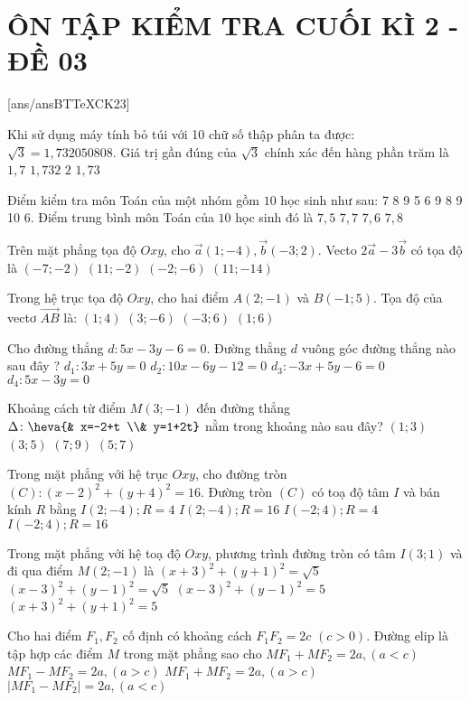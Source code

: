 \section*{ÔN TẬP KIỂM TRA CUỐI KÌ 2 - ĐỀ 03}
\setcounter{ex}{0}\setcounter{bt}{0}
[ans/ansBTTeXCK23]
\begin{ex}
	Khi sử dụng máy tính bỏ túi với 10 chữ số thập phân ta được: $\sqrt{3}=1{,}732050808$. Giá trị gần đúng của $\sqrt{3}$ chính xác đến hàng phần trăm là
	\choice
	{$1{,}7$}
	{$1{,}732$}
	{$2$}
	{$1{,}73$}
\end{ex}
\begin{ex} 
	Điểm kiểm tra môn Toán của một nhóm gồm $10$ học sinh như sau: 7 8 9 5 6 9 8 9 10 6.
	Điểm trung bình môn Toán của $10$ học sinh đó là
	\choice
	{$7{,}5$}
	{$7{,}7$}
	{$7{,}6$}
	{$7{,}8$}
\end{ex}
\begin{ex}
	Trên mặt phẳng tọa độ $Oxy$, cho $\vec{a}(1;-4),\vec{b}(-3;2)$. Vecto $2\vec{a}-3\vec{b}$ có tọa độ là
	\choice
	{$(-7;-2)$}
	{$(11;-2)$}
	{$(-2;-6)$}
	{$(11;-14)$}
\end{ex}
\begin{ex}
	Trong hệ trục tọa độ $Oxy$, cho hai điểm $A(2;-1)$ và $B(-1;5)$. Tọa độ của vectơ $\vec{AB}$ là:
	\choice
	{$(1;4)$}
	{$(3;-6)$}
	{$(-3;6)$}
	{$(1;6)$}
\end{ex}
\begin{ex}
	Cho đường thẳng $d\colon 5x-3y-6=0$. Đường thẳng $d$ vuông góc đường thẳng nào sau đây ?
	\choice
	{$d_1\colon 3x+5y=0$}
	{$d_2\colon 10x-6y-12=0$}
	{$d_3\colon -3x+5y-6=0$}
	{$d_4\colon 5x-3y=0$}
\end{ex}
\begin{ex}
	Khoảng cách từ điểm $M(3;-1)$ đến đường thẳng $\Delta \colon \heva{& x=-2+t \\& y=1+2t}$ nằm trong khoảng nào sau đây?
	\choice
	{$(1;3)$}
	{$(3;5)$}
	{$(7;9)$}
	{$(5;7)$}
\end{ex}
\begin{ex}
	Trong mặt phẳng với hệ trục $Oxy$, cho đường tròn $(C)\colon (x-2)^2+(y+4)^2=16$. Đường tròn $(C)$ có toạ độ tâm $I$ và bán kính $R$ bằng
	\choice
	{$I(2;-4);R=4$}
	{$I(2;-4);R=16$}
	{$I(-2;4);R=4$}
	{$I(-2;4);R=16$}
\end{ex}
\begin{ex}
Trong mặt phẳng với hệ toạ độ $Oxy$, phương trình đường tròn có tâm $I(3;1)$ và đi qua điểm $M(2;-1)$ là
\choice
{${{(x+3)}^2}+{{(y+1)}^2}=\sqrt{5}$}
{${{(x-3)}^2}+{{(y-1)}^2}=\sqrt{5}$}
{${{(x-3)}^2}+{{(y-1)}^2}=5$}
{${{(x+3)}^2}+{{(y+1)}^2}=5$}
\end{ex}
\begin{ex}
Cho hai điểm $F_1,F_2$ cố định có khoảng cách $F_1F_2=2c$ $\left(c>0\right)$. Đường elip là tập hợp các điểm $M$ trong mặt phẳng sao cho
	\choice
	{$MF_1+MF_2=2a,\left(a<c\right)$}
	{$MF_1-MF_2=2a,\left(a>c\right)$}
	{$MF_1+MF_2=2a,\left(a>c\right)$}
	{$\left| MF_1-MF_2 \right|=2a,\left(a<c\right)$}
\end{ex}

